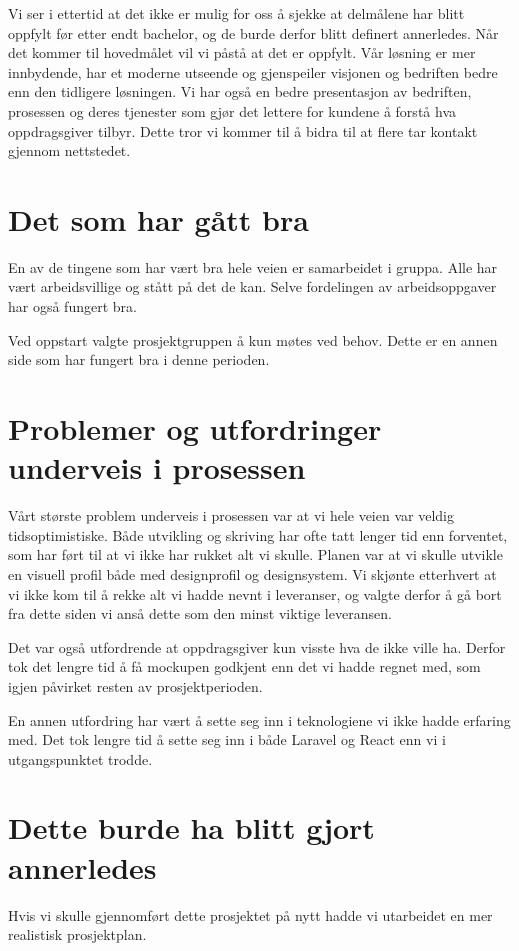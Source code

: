 Vi ser i ettertid at det ikke er mulig for oss å sjekke at delmålene har blitt oppfylt før etter endt bachelor, og de burde derfor blitt definert annerledes. Når det kommer til hovedmålet vil vi påstå at det er oppfylt. Vår løsning er mer innbydende, har et moderne utseende og gjenspeiler visjonen og bedriften bedre enn den tidligere løsningen. Vi har også en bedre presentasjon av bedriften, prosessen og deres tjenester som gjør det lettere for kundene å forstå hva oppdragsgiver tilbyr. Dette tror vi kommer til å bidra til at flere tar kontakt gjennom nettstedet.

\section{Det som har gått bra}
En av de tingene som har vært bra hele veien er samarbeidet i gruppa. Alle har vært arbeidsvillige og stått på det de kan. Selve fordelingen av arbeidsoppgaver har også fungert bra.

Ved oppstart valgte prosjektgruppen å kun møtes ved behov. Dette er en annen side som har fungert bra i denne perioden. 

\section{Problemer og utfordringer underveis i prosessen}
Vårt største problem underveis i prosessen var at vi hele veien var veldig tidsoptimistiske. Både utvikling og skriving har ofte tatt lenger tid enn forventet, som har ført til at vi ikke har rukket alt vi skulle. Planen var at vi skulle utvikle en visuell profil både med designprofil og designsystem. Vi skjønte etterhvert at vi ikke kom til å rekke alt vi hadde nevnt i leveranser, og valgte derfor å gå bort fra dette siden vi anså dette som den minst viktige leveransen. 

Det var også utfordrende at oppdragsgiver kun visste hva de ikke ville ha. Derfor tok det lengre tid å få mockupen godkjent enn det vi hadde regnet med, som igjen påvirket resten av prosjektperioden.

En annen utfordring har vært å sette seg inn i teknologiene vi ikke hadde erfaring med. Det tok lengre tid å sette seg inn i både Laravel og React enn vi i utgangspunktet trodde. 

\section{Dette burde ha blitt gjort annerledes}
Hvis vi skulle gjennomført dette prosjektet på nytt hadde vi utarbeidet en mer realistisk prosjektplan. 





